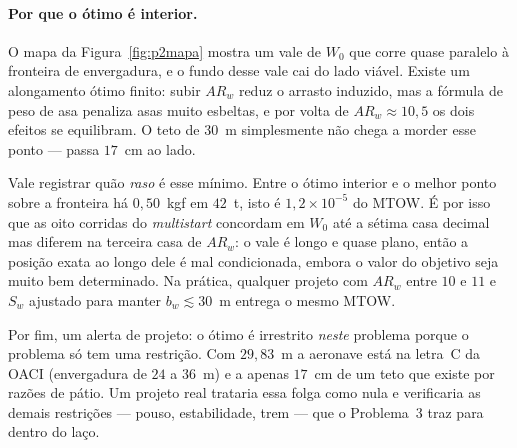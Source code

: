 \paragraph{Por que o ótimo é interior.}
O mapa da Figura~\ref{fig:p2mapa} mostra um vale de $W_0$ que corre
quase paralelo à fronteira de envergadura, e o fundo desse vale cai
do lado viável. Existe um alongamento ótimo finito: subir $AR_w$ reduz o
arrasto induzido, mas a fórmula de peso de asa penaliza asas muito
esbeltas, e por volta de $AR_w \approx 10{,}5$ os dois efeitos se
equilibram. O teto de $30$~m simplesmente não chega a morder esse
ponto --- passa $17$~cm ao lado.

Vale registrar quão \emph{raso} é esse mínimo. Entre o ótimo interior e
o melhor ponto sobre a fronteira há $0{,}50$~kgf em $42$~t, isto é
$1{,}2\times 10^{-5}$ do MTOW. É por isso que as oito corridas do
\emph{multistart} concordam em $W_0$ até a sétima casa decimal mas
diferem na terceira casa de $AR_w$: o vale é longo e quase plano, então
a posição exata ao longo dele é mal condicionada, embora o valor do
objetivo seja muito bem determinado. Na prática, qualquer projeto com
$AR_w$ entre $10$ e $11$ e $S_w$ ajustado para manter $b_w \lesssim 30$~m
entrega o mesmo MTOW.

Por fim, um alerta de projeto: o ótimo é irrestrito \emph{neste} problema
porque o problema só tem uma restrição. Com $29{,}83$~m a aeronave está
na letra~C da OACI (envergadura de $24$ a $36$~m) e a apenas $17$~cm de
um teto que existe por razões de pátio. Um projeto real trataria essa
folga como nula e verificaria as demais restrições --- pouso,
estabilidade, trem --- que o Problema~3 traz para dentro do laço.
